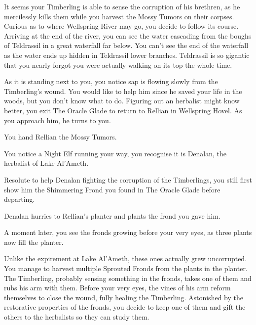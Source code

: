 It seems your Timberling is able to sense the corruption of his brethren, as he mercilessly kills them while you harvest the Mossy Tumors on their corpses. Curious as to where Wellspring River may go, you decide to follow its course. Arriving at the end of the river, you can see the water cascading from the boughs of Teldrassil in a great waterfall far below. You can't see the end of the waterfall as the water ends up hidden in Teldrassil lower branches. Teldrassil is so gigantic that you nearly forgot you were actually walking on its top the whole time.

As it is standing next to you, you notice sap is flowing slowly from the Timberling's wound. You would like to help him since he saved your life in the woods, but you don't know what to do. Figuring out an herbalist might know better, you exit The Oracle Glade to return to Rellian in Wellspring Hovel. As you approach him, he turns to you.


You hand Rellian the Mossy Tumors.


You notice a Night Elf running your way, you recognise it is Denalan, the herbalist of Lake Al'Ameth.


Resolute to help Denalan fighting the corruption of the Timberlings, you still first show him the Shimmering Frond you found in The Oracle Glade before departing.


Denalan hurries to Rellian's planter and plants the frond you gave him.


A moment later, you see the fronds growing before your very eyes, as three plants now fill the planter.


Unlike the expirement at Lake Al'Ameth, these ones actually grew uncorrupted. You manage to harvest multiple Sprouted Fronds from the plants in the planter. The Timberling, probably sensing something in the fronds, takes one of them and rubs his arm with them. Before your very eyes, the vines of his arm reform themselves to close the wound, fully healing the Timberling. Astonished by the restorative properties of the fronds, you decide to keep one of them and gift the others to the herbalists so they can study them.

